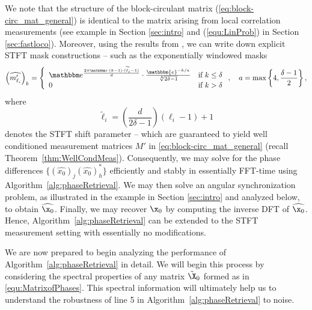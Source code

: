 We note that the structure of the block-circulant matrix
(\ref{eq:block-circ_mat_general}) is identical to the matrix arising
from local correlation measurements (see example in Section
\ref{sec:intro} and
(\ref{equ:LinProb}) in Section \ref{sec:fastloco}). Moreover, using the
results from \cite{IVW2015_FastPhase}, we can write down explicit STFT
mask constructions -- such as the exponentially windowed masks
%
\begin{equation}
    \left(\widehat{m^\prime_{\ell_i}}\right)_k = \left\{ 
    \begin{array}{ll}
        \mathbbm e^{\frac{2 \pi \mathbbm i \cdot (k-1) 
            \cdot (\widetilde \ell_i-1)}d} \cdot 
        \frac{\mathbbm{e}^{-k/a}}{\sqrt[4]{2\delta -1}} 
            & 
                \textrm{if}~k \leq \delta \\ 
        0 &
                \textrm{if}~k > \delta
    \end{array} \right.,  \quad a = \max \left \{4,
                \frac{\delta-1}2 \right \},
    \label{equ:STFTmeasDEF}
\end{equation}
%
where 
\begin{equation*}
    \widetilde \ell_i = \left( \frac d{2\delta-1} \right)
    (\ell_i-1) + 1
\end{equation*}
%
denotes the STFT shift parameter -- which are guaranteed to yield well conditioned measurement matrices $M'$ in \eqref{eq:block-circ_mat_general} (recall Theorem~\ref{thm:WellCondMeas}).
Consequently, we may solve for the phase differences $\{\left(\widehat{ x_0}\right)_j
\left(\widehat{x_0}\right)_h^*\}$ efficiently and stably in essentially FFT-time using Algorithm~\ref{alg:phaseRetrieval}.  We
may then solve an angular synchronization problem, as illustrated in the
example in Section \ref{sec:intro} and analyzed below, to obtain $\widehat{ \x_0}$.  Finally, we may recover $\x_0$ by
computing the inverse DFT of $\widehat{ \x_0}$.   Hence, Algorithm~\ref{alg:phaseRetrieval} can be extended to the STFT measurement setting with essentially no modifications. 

We are now prepared to begin analyzing the performance of Algorithm~\ref{alg:phaseRetrieval} in detail.  We will begin this process by considering the spectral properties of any matrix $\tilde{\X}_0$ formed as in \eqref{equ:MatrixofPhases}.  This spectral information will ultimately help us to understand the robustness of line 5 in Algorithm~\ref{alg:phaseRetrieval} to noise.

